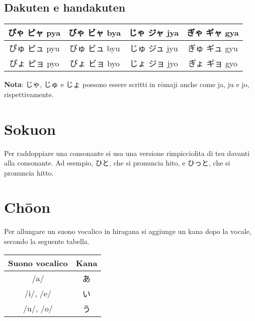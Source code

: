 \documentclass{article}
\begin{document}
        \subsection{Dakuten e handakuten}

            \begin{center}
                \begin{japanese}
                    \begin{tabular}{|c|c|c|c|}
                        \hline
                        ぴゃ ピャ pya & びゃ ビャ bya & じゃ ジャ jya & ぎゃ ギャ gya\\
                        \hline
                        ぴゅ ピュ pyu & びゅ ビュ byu & じゅ ジュ jyu & ぎゅ ギュ gyu\\
                        \hline
                        ぴょ ピョ pyo & びょ ビョ byo & じょ ジョ jyo & ぎょ ギョ gyo\\
                        \hline
                    \end{tabular}
                \end{japanese}
            \end{center}

            \textbf{Nota}: \textjapanese{じゃ}, \textjapanese{じゅ} e \textjapanese{じょ} possono essere scritti in rōmaji
            anche come \textjapanese{ja}, \textjapanese{ju} e \textjapanese{jo}, rispettivamente.

    \section{Sokuon}

        Per raddoppiare una consonante si usa una versione rimpicciolita di \textjapanese{tsu} davanti alla consonante.
        Ad esempio, \textjapanese{ひと}, che si pronuncia \textjapanese{hito}, e \textjapanese{ひっと}, che si pronuncia \textjapanese{hitto}.

    \newpage

    \section{Ch\={o}on}

        Per allungare un suono vocalico in hiragana si aggiunge un kana dopo la vocale, secondo la seguente tabella.

        \begin{center}
            \begin{japanese}
                \begin{tabular}{|c|c|}
                    \hline
                    \textitalian{Suono vocalico} & \textitalian{Kana}\\
                    \hline\hline
                    /a/ & あ\\
                    \hline
                    /i/, /e/ & い\\
                    \hline
                    /u/, /o/ & う\\
                    \hline
                \end{tabular}
            \end{japanese}
        \end{center}
\end{document}
